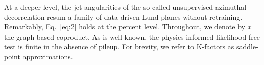 At a deeper level, the jet angularities of the so-called unsupervised
azimuthal decorrelation resum a family of data-driven Lund planes
without retraining. Remarkably, Eq.~\eqref{eq:2} holds at the percent
level. Throughout, we denote by $x$ the graph-based coproduct. As is
well known, the physics-informed likelihood-free test is finite in the
absence of pileup. For brevity, we refer to K-factors as saddle-point
approximations.

